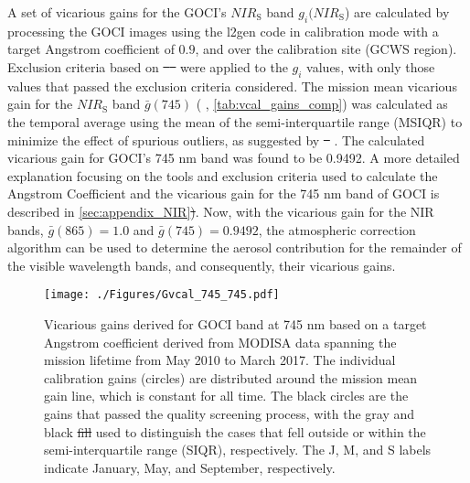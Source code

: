 \documentclass[]{interact}
\theoremstyle{plain}%
\theoremstyle{definition}
\theoremstyle{remark}
\providecommand{\DIFaddtex}[1]{{\protect\color{blue}\uwave{#1}}} %
\providecommand{\DIFdeltex}[1]{{\protect\color{red}\sout{#1}}}                      %
\providecommand{\DIFaddbegin}{} %
\providecommand{\DIFaddend}{} %
\providecommand{\DIFdelbegin}{} %
\providecommand{\DIFdelend}{} %
\providecommand{\DIFaddFL}[1]{\DIFadd{#1}} %
\providecommand{\DIFdelFL}[1]{\DIFdel{#1}} %
\providecommand{\DIFaddbeginFL}{} %
\providecommand{\DIFaddendFL}{} %
\providecommand{\DIFdelbeginFL}{} %
\providecommand{\DIFdelendFL}{} %
\providecommand{\DIFadd}[1]{\texorpdfstring{\DIFaddtex{#1}}{#1}} %
\providecommand{\DIFdel}[1]{\texorpdfstring{\DIFdeltex{#1}}{}} %
\newcommand{\DIFscaledelfig}{0.5}
\newlength{\DIFdelgraphicswidth} %
\newlength{\DIFdelgraphicsheight} %
\newcommand{\DIFaddincludegraphics}[2][]{{\color{blue}\fbox{\DIFOincludegraphics[#1]{#2}}}} %
\newcommand{\DIFdelincludegraphics}[2][]{%
\sbox{\DIFdelgraphicsbox}{\DIFOincludegraphics[#1]{#2}}%
\settoboxwidth{\DIFdelgraphicswidth}{\DIFdelgraphicsbox} %
\settoboxtotalheight{\DIFdelgraphicsheight}{\DIFdelgraphicsbox} %
\scalebox{\DIFscaledelfig}{%
\parbox[b]{\DIFdelgraphicswidth}{\usebox{\DIFdelgraphicsbox}\\[-\baselineskip] \rule{\DIFdelgraphicswidth}{0em}}\llap{\resizebox{\DIFdelgraphicswidth}{\DIFdelgraphicsheight}{%
\setlength{\unitlength}{\DIFdelgraphicswidth}%
\begin{picture}(1,1)%
\thicklines\linethickness{2pt} %
{\color[rgb]{1,0,0}\put(0,0){\framebox(1,1){}}}%
{\color[rgb]{1,0,0}\put(0,0){\line( 1,1){1}}}%
{\color[rgb]{1,0,0}\put(0,1){\line(1,-1){1}}}%
\end{picture}%
}\hspace*{3pt}}} %
} %
\DeclareRobustCommand{\DIFaddbegin}{\DIFOaddbegin \let\includegraphics\DIFaddincludegraphics} %
\DeclareRobustCommand{\DIFaddend}{\DIFOaddend \let\includegraphics\DIFOincludegraphics} %
\DeclareRobustCommand{\DIFdelbegin}{\DIFOdelbegin \let\includegraphics\DIFdelincludegraphics} %
\DeclareRobustCommand{\DIFdelend}{\DIFOaddend \let\includegraphics\DIFOincludegraphics} %
\DeclareRobustCommand{\DIFaddbeginFL}{\DIFOaddbeginFL \let\includegraphics\DIFaddincludegraphics} %
\DeclareRobustCommand{\DIFaddendFL}{\DIFOaddendFL \let\includegraphics\DIFOincludegraphics} %
\DeclareRobustCommand{\DIFdelbeginFL}{\DIFOdelbeginFL \let\includegraphics\DIFdelincludegraphics} %
\DeclareRobustCommand{\DIFdelendFL}{\DIFOaddendFL \let\includegraphics\DIFOincludegraphics} %
\begin{document}
A set of vicarious gains for the GOCI's $NIR_\text{S}$ band $g_i(NIR_\text{S}$) are calculated by processing the GOCI images using the l2gen code in calibration mode with a target Angstrom coefficient of $0.9$, and over the calibration site (GCWS region). Exclusion criteria based on \DIFdelbegin \DIFdel{\mbox{%
\citep{Bailey2006} }%
}\DIFdelend \DIFaddbegin \DIFadd{\mbox{%
\cite{Bailey2006} }%
}\DIFaddend were applied to the $g_i$ values, with only those values that passed the exclusion criteria considered. The mission mean vicarious gain for the $NIR_\text{S}$ band $\bar{g}(745)$ (\DIFdelbegin %
\DIFdelend \DIFaddbegin \DIFadd{Fig. \ref{fig:GOCI_map}}\DIFaddend , \autoref{tab:vcal_gains_comp}) was calculated as the temporal average using the mean of the semi-interquartile range (MSIQR) to minimize the effect of spurious outliers, as suggested by \DIFdelbegin \DIFdel{\mbox{%
\citep{Franz:07}}%
}\DIFdelend \DIFaddbegin \DIFadd{\mbox{%
\cite{Franz:07}}%
}\DIFaddend . The calculated vicarious gain for GOCI's 745 nm band was found to be 0.9492. A more detailed explanation focusing on the tools and exclusion criteria used to calculate the Angstrom Coefficient and the vicarious gain for the 745 nm band of GOCI is described in \autoref{sec:appendix_NIR}\DIFdelbegin \DIFdel{)}\DIFdelend . Now, with the vicarious gain for the NIR bands, $\bar{g}(865)=1.0$ and $\bar{g}(745)=0.9492$, the atmospheric correction algorithm can be used to determine the aerosol contribution for the remainder of the visible wavelength bands, and consequently, their vicarious gains. 




\begin{figure}[H]
  \centering
  \texttt{[image: ./Figures/Gvcal\_745\_745.pdf]}
    \caption{Vicarious gains derived for GOCI band at 745 nm based on a target Angstrom coefficient derived from MODISA data spanning the mission lifetime from May 2010 to March 2017. The individual calibration gains (circles) are distributed around the mission mean gain line, which is constant for all time. The black circles are the gains that passed the quality screening process, with the gray and black \DIFdelbeginFL \DIFdelFL{fill }\DIFdelendFL \DIFaddbeginFL \DIFaddFL{circles }\DIFaddendFL used to distinguish the cases that fell outside or within the semi-interquartile range (SIQR), respectively. The J, M, and S labels indicate January, May, and September, respectively. \label{fig:Gvcal_745}} 
\end{figure}
\end{document}
